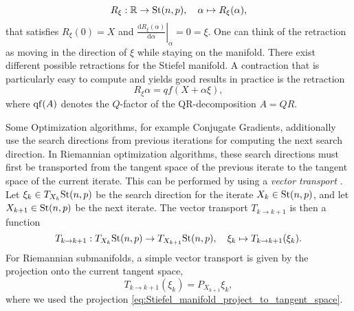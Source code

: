 \begin{equation}
	R_\xi : \mathbb{R} \rightarrow \text{St}(n,p), \quad \alpha \mapsto R_\xi(\alpha),
\end{equation}
that satisfies $R_\xi(0) = X$ and $\left.\frac{\text{d}R_\xi(\alpha)}{\text{d}\alpha}\right|_\alpha=0 = \xi$. One can think of the retraction as moving in the direction of $\xi$ while staying on the manifold. There exist different possible retractions for the Stiefel manifold. A contraction that is particularly easy to compute and yields good results in practice is the retraction
\begin{equation}
	R_\xi{\alpha} = qf(X+\alpha\xi),
\end{equation}
where $\operatorname{qf}(A)$ denotes the $Q$-factor of the QR-decomposition $A = QR$. \par
Some Optimization algorithms, for example Conjugate Gradients, additionally use the search directions from previous iterations for computing the next search direction. In Riemannian optimization algorithms, these search directions must first be transported from the tangent space of the previous iterate to the tangent space of the current iterate. This can be performed by using a \textit{vector transport} \cite{cite:optimization_on_matrix_manifolds}. Let $\xi_k\in T_{X_k} \text{St}(n,p)$ be the search direction for the iterate $X_k \in\text{St}(n,p)$, and let $X_{k+1}\in\text{St}(n,p)$ be the next iterate. The vector transport $T_{k\rightarrow k+1}$ is then a function
\begin{equation}
	\label{eq:vector transport}
	T_{k\rightarrow k+1} : T_{X_k} \text{St}(n,p) \rightarrow T_{X_{k+1}} \text{St}(n,p), \quad \xi_k \mapsto T_{k\rightarrow k+1}(\xi_k).
\end{equation}
For Riemannian submanifolds, a simple vector transport is given by the projection onto the current tangent space,
\begin{equation}
	\label{eq:vector_transport_stiefel_manifold}
	T_{k\rightarrow k+1}(\xi_k) = P_{X_{k+1}}\xi_k,
\end{equation}
where we used the projection \eqref{eq:Stiefel_manifold_project_to_tangent_space}.